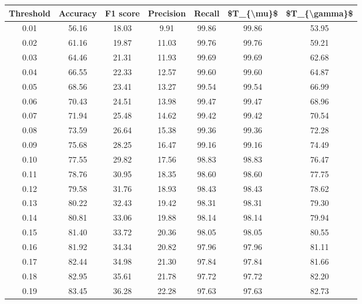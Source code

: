 \begin{tabular}{|c|c|c|c|c|c|c|}
\toprule
 Threshold &  Accuracy &  F1 score &  Precision &  Recall &  \$T\_\{\textbackslash mu\}\$ &  \$T\_\{\textbackslash gamma\}\$ \\
\hline
      0.01 &     56.16 &     18.03 &       9.91 &   99.86 &      99.86 &         53.95 \\
      0.02 &     61.16 &     19.87 &      11.03 &   99.76 &      99.76 &         59.21 \\
      0.03 &     64.46 &     21.31 &      11.93 &   99.69 &      99.69 &         62.68 \\
      0.04 &     66.55 &     22.33 &      12.57 &   99.60 &      99.60 &         64.87 \\
      0.05 &     68.56 &     23.41 &      13.27 &   99.54 &      99.54 &         66.99 \\
      0.06 &     70.43 &     24.51 &      13.98 &   99.47 &      99.47 &         68.96 \\
      0.07 &     71.94 &     25.48 &      14.62 &   99.42 &      99.42 &         70.54 \\
      0.08 &     73.59 &     26.64 &      15.38 &   99.36 &      99.36 &         72.28 \\
      0.09 &     75.68 &     28.25 &      16.47 &   99.16 &      99.16 &         74.49 \\
      0.10 &     77.55 &     29.82 &      17.56 &   98.83 &      98.83 &         76.47 \\
      0.11 &     78.76 &     30.95 &      18.35 &   98.60 &      98.60 &         77.75 \\
      0.12 &     79.58 &     31.76 &      18.93 &   98.43 &      98.43 &         78.62 \\
      0.13 &     80.22 &     32.43 &      19.42 &   98.31 &      98.31 &         79.30 \\
      0.14 &     80.81 &     33.06 &      19.88 &   98.14 &      98.14 &         79.94 \\
      0.15 &     81.40 &     33.72 &      20.36 &   98.05 &      98.05 &         80.55 \\
      0.16 &     81.92 &     34.34 &      20.82 &   97.96 &      97.96 &         81.11 \\
      0.17 &     82.44 &     34.98 &      21.30 &   97.84 &      97.84 &         81.66 \\
      0.18 &     82.95 &     35.61 &      21.78 &   97.72 &      97.72 &         82.20 \\
      0.19 &     83.45 &     36.28 &      22.28 &   97.63 &      97.63 &         82.73 \\

\end{tabular}
